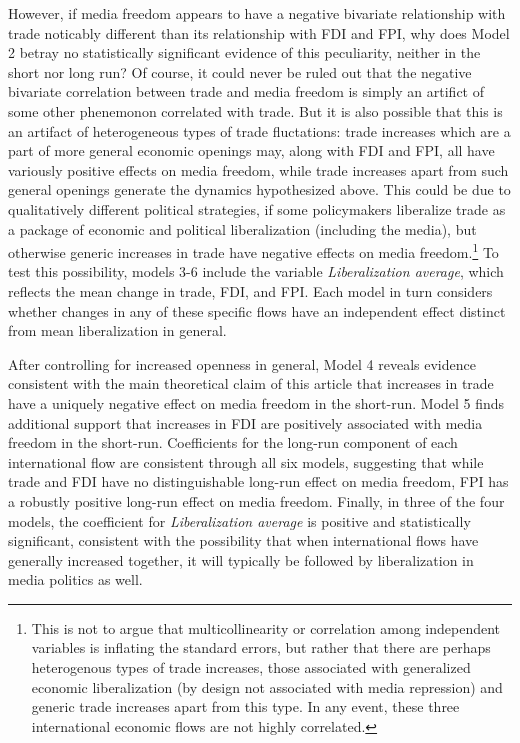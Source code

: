 \documentclass[12pt,a4paper]{article}\usepackage[]{graphicx}\usepackage[]{color}
\begin{document}
However, if media freedom appears to have a negative bivariate relationship with trade noticably different than its relationship with FDI and FPI, why does Model 2 betray no statistically significant evidence of this peculiarity, neither in the short nor long run? Of course, it could never be ruled out that the negative bivariate correlation between trade and media freedom is simply an artifict of some other phenemonon correlated with trade. But it is also possible that this is an artifact of heterogeneous types of trade fluctations: trade increases which are a part of more general economic openings may, along with FDI and FPI, all have variously positive effects on media freedom, while trade increases apart from such general openings generate the dynamics hypothesized above. This could be due to qualitatively different political strategies, if some policymakers liberalize trade as a package of economic and political liberalization (including the media), but otherwise generic increases in trade have negative effects on media freedom.\footnote{This is not to argue that multicollinearity or correlation among independent variables is inflating the standard errors, but rather that there are perhaps heterogenous types of trade increases, those associated with generalized economic liberalization (by design not associated with media repression) and generic trade increases apart from this type. In any event, these three international economic flows are not highly correlated.} To test this possibility, models 3-6 include the variable \emph{Liberalization average}, which reflects the mean change in trade, FDI, and FPI. Each model in turn considers whether changes in any of these specific flows have an independent effect distinct from mean liberalization in general.

After controlling for increased openness in general, Model 4 reveals evidence consistent with the main theoretical claim of this article that increases in trade have a uniquely negative effect on media freedom in the short-run. Model 5 finds additional support that increases in FDI are positively associated with media freedom in the short-run. Coefficients for the long-run component of each international flow are consistent through all six models, suggesting that while trade and FDI have no distinguishable long-run effect on media freedom, FPI has a robustly positive long-run effect on media freedom. Finally, in three of the four models, the coefficient for \emph{Liberalization average} is positive and statistically significant, consistent with the possibility that when international flows have generally increased together, it will typically be followed by liberalization in media politics as well.
\end{document}
